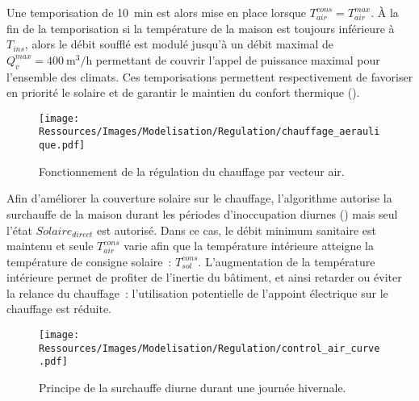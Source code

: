 Une temporisation de \SI{10}{min} est alors mise en place lorsque $T_{air}^{cons} = T_{air}^{max}$.
À la fin de la temporisation si la température de la maison est
toujours inférieure à $T_{ins}$, alors le débit soufflé est modulé jusqu’à un débit maximal de
$Q_{v}^{max} = \SI[per-mode=symbol]{400}{\meter\cubed\per\hour}$ permettant de couvrir
l’appel de puissance maximal pour l’ensemble des climats. Ces
temporisations permettent respectivement de favoriser en priorité le solaire et de
garantir le maintien du confort thermique ().

\begin{figure}
    \centering
    \texttt{[image: Ressources/Images/Modelisation/Regulation/chauffage\_aeraulique.pdf]}
    \caption[Fonctionnement de la régulation du chauffage par vecteur air]
            {Fonctionnement de la régulation du chauffage par vecteur air.}
    \label{fig:chauffage_aeraulique}
\end{figure}

Afin d’améliorer la couverture solaire sur le chauffage, l’algorithme autorise la
surchauffe de la maison durant les périodes d’inoccupation diurnes
() mais seul l’état $Solaire_{direct}$ est autorisé. Dans ce
cas, le débit minimum sanitaire est maintenu et seule $T_{air}^{cons}$ varie afin que la
température intérieure atteigne la température de consigne solaire~: $T^{cons}_{sol}$.
L’augmentation de la température intérieure permet de profiter de l’inertie du bâtiment, et
ainsi retarder ou éviter la relance du chauffage~: l’utilisation potentielle de
l’appoint électrique sur le chauffage est réduite.
\begin{figure}
    \centering
    \texttt{[image: Ressources/Images/Modelisation/Regulation/control\_air\_curve.pdf]}
    \caption[Principe de la surchauffe diurne durant une journée hivernale]
            {Principe de la surchauffe diurne durant une journée hivernale.}
    \label{fig:control_air}
\end{figure}


